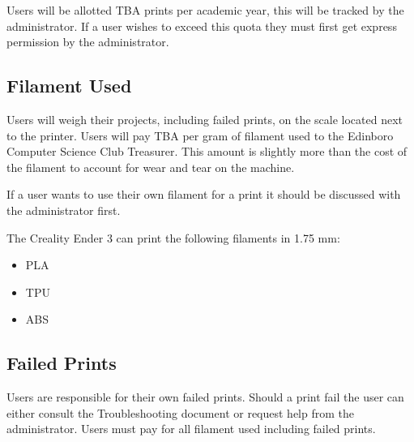 \documentclass{article}
\begin{document}
Users will be allotted TBA prints per academic year, this will be tracked by the
administrator. If a user wishes to exceed this quota they must first get
express permission by the administrator.

\subsection{Filament Used}

Users will weigh their projects, including failed prints, on the scale located
next to the printer. Users will pay TBA per gram of filament used to the
Edinboro Computer Science Club Treasurer. This amount is slightly more than the
cost of the filament to account for wear and tear on the machine.

If a user wants to use their own filament for a print it should be discussed
with the administrator first.

The Creality Ender 3 can print the following filaments in 1.75 mm:

\begin{itemize}
	\item PLA
	\item TPU
	\item ABS
\end{itemize}

\subsection{Failed Prints}

Users are responsible for their own failed prints. Should a print fail the user
can either consult the Troubleshooting document or request help from the
administrator. Users must pay for all filament used including failed prints.
\end{document}
